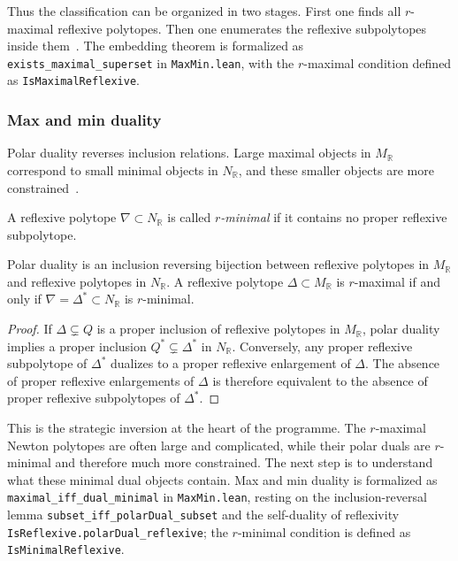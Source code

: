 \documentclass[appliedmath,article,submit,moreauthors]{Definitions/mdpi}
\newcommand{\RR}{\mathbb{R}}
\begin{document}
Thus the classification can be organized in two stages.  First one finds all
\(r\)-maximal reflexive polytopes.  Then one enumerates the reflexive
subpolytopes inside them~\cite{KreuzerSkarke2000}.  The embedding theorem is
formalized as \nolinkurl{exists\_maximal\_superset} in \nolinkurl{MaxMin.lean},
with the \(r\)-maximal condition defined as \nolinkurl{IsMaximalReflexive}.

\subsubsection{Max and min duality}
\label{sec:math-maxmin}

Polar duality reverses inclusion relations. Large maximal objects in \(M_{\RR}\)
correspond to small minimal objects in \(N_{\RR}\), and these smaller objects
are more constrained~\cite{KS97,KSFibrations2002}.

\begin{Definition}
\label{def:rminimal}
A reflexive polytope \(\nabla\subset N_{\RR}\) is called \emph{\(r\)-minimal} if
it contains no proper reflexive subpolytope.
\end{Definition}

\begin{Theorem}
\label{thm:maxmin}
Polar duality is an inclusion reversing bijection between reflexive polytopes in
\(M_{\RR}\) and reflexive polytopes in \(N_{\RR}\). A reflexive polytope
\(\Delta\subset M_{\RR}\) is \(r\)-maximal if and only if
\(\nabla=\Delta^*\subset N_{\RR}\) is \(r\)-minimal.
\end{Theorem}

\begin{proof}
If \(\Delta\subsetneq Q\) is a proper inclusion of reflexive polytopes in
\(M_{\RR}\), polar duality implies a proper inclusion \(Q^*\subsetneq\Delta^*\)
in \(N_{\RR}\). Conversely, any proper reflexive subpolytope of \(\Delta^*\)
dualizes to a proper reflexive enlargement of \(\Delta\). The absence of proper
reflexive enlargements of \(\Delta\) is therefore equivalent to the absence of
proper reflexive subpolytopes of \(\Delta^*\).
\end{proof}

This is the strategic inversion at the heart of the programme.  The
\(r\)-maximal Newton polytopes are often large and complicated, while their
polar duals are \(r\)-minimal and therefore much more constrained.  The next
step is to understand what these minimal dual objects contain.  Max and min
duality is formalized as \nolinkurl{maximal\_iff\_dual\_minimal} in
\nolinkurl{MaxMin.lean}, resting on the inclusion-reversal lemma
\nolinkurl{subset\_iff\_polarDual\_subset} and the self-duality of reflexivity
\nolinkurl{IsReflexive.polarDual\_reflexive}; the \(r\)-minimal condition is
defined as \nolinkurl{IsMinimalReflexive}.
\end{document}
